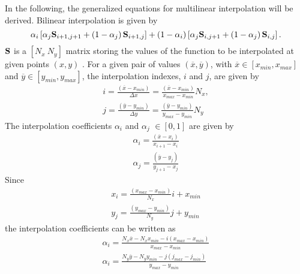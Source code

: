 \documentclass[a4paper, 12 pt, fleqn]{article}
\begin{document}
In the following, the generalized equations for multilinear interpolation will be derived. 
Bilinear interpolation is given by
\begin{equation}
\alpha_i \left[ \alpha_j \bold{S}_{i+1,j+1} + \left(1-\alpha_j\right)\bold{S}_{i+1,j}\right] +\left(1-\alpha_i\right) \left[ \alpha_j \bold{S}_{i,j+1} + \left(1-\alpha_j\right)\bold{S}_{i,j}\right].
\end{equation}
$\bold{S}$ is a $[N_x \ N_y]$ matrix storing the values of the function to be interpolated at given points $(x,y)$ . For a given pair of values $(\overline{x},\overline{y})$, with $\overline{x} \in [x_{min},x_{max}]$ and $\overline{y} \in [y_{min},y_{max}]$, the interpolation indexes, $i$ and $j$, are given by 
\begin{eqnarray}
i = \frac{\left(\overline{x}-x_{min}\right)}{\Delta x} = \frac{\left(\overline{x}-x_{min}\right)}{x_{max}-x_{min}}N_x,  \\ 
j = \frac{\left(\overline{y}-y_{min}\right)}{\Delta y} = \frac{\left(\overline{y}-y_{min}\right)}{y_{max}-y_{min}}N_y 
\end{eqnarray}
The interpolation coefficients $\alpha_i$ and $\alpha_j$ $\in [0,1]$ are given by 
\begin{eqnarray}\label{3}
\alpha_i = \frac{\left(\overline{x}-x_i\right)}{x_{i+1}-x_i} \\
\alpha_j = \frac{\left(\overline{y}-y_j\right)}{y_{j+1}-x_j}
\end{eqnarray}
Since 
\begin{eqnarray}
x_i = \frac{\left(x_{max}-x_{min}\right)}{N_x}i + x_{min} \\
y_j = \frac{\left(y_{max}-y_{min}\right)}{N_y}j + y_{min}
\end{eqnarray}
the interpolation coefficients can be written as
\begin{eqnarray}
\alpha_i = \frac{N_x \overline{x} - N_x x_{min} -i\left(x_{max}-x_{min}\right)}{x_{max}-x_{min}} \\
\alpha_i = \frac{N_y \overline{y} - N_y y_{min} -j\left(j_{max}-j_{min}\right)}{y_{max}-y_{min}}
\end{eqnarray}
\end{document}
